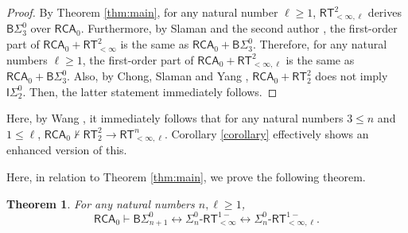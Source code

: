 \documentclass[10pt,reqno]{amsart}
\newtheorem{theorem}{Theorem}
\numberwithin{equation}{section}
\begin{document}
\begin{proof}
By Theorem \ref{thm:main}, for any natural number $\ell \ge 1$, $\mathsf{RT}_{<\infty,\ell}^{2}$ derives $\mathsf{B}\Sigma_{3}^{0}$ over $\mathsf{RCA}_0$. Furthermore, by Slaman and the second author \cite{Slaman-Yokoyama}, the first-order part of $\mathsf{RCA}_0+\mathsf{RT}_{<\infty}^{2}$ is the same as $\mathsf{RCA}_0+\mathsf{B}\Sigma_{3}^{0}$. Therefore, for any natural numbers $\ell\ge 1$, the first-order part of $\mathsf{RCA}_0+\mathsf{RT}_{<\infty,\ell}^{2}$ is the same as $\mathsf{RCA}_0+\mathsf{B}\Sigma_{3}^{0}$.
Also, by Chong, Slaman and Yang \cite{Chong-Slaman-Yang}, $\mathsf{RCA}_0+\mathsf{RT}_{2}^{2}$ does not imply $\mathsf{I}\Sigma_{2}^{0}$.
Then, the latter statement immediately follows.
\end{proof}
Here, by Wang \cite[Corollary 3.4]{Wang}, it immediately follows that for any natural numbers $3\le n$ and $1\le\ell$, $\mathsf{RCA}_0\not\vdash\mathsf{RT}_{2}^{2}\rightarrow\mathsf{RT}_{<\infty,\ell}^{n}$. Corollary \ref{corollary} effectively shows an enhanced version of this.


Here, in relation to Theorem \ref{thm:main}, we prove the following theorem.
\begin{theorem}\label{thm:equivalence}
For any natural numbers $n,\ell \ge 1$,
\[\mathsf{RCA}_0\vdash\mathsf{B}\Sigma_{n+1}^{0}\leftrightarrow \Sigma_{n}^{0}\text{-}\mathsf{RT}_{<\infty}^{1-}\leftrightarrow\Sigma_{n}^{0}\text{-}\mathsf{RT}_{<\infty,\ell}^{1-}.\]
\end{theorem}
\end{document}
